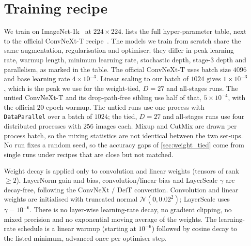 \section{Training recipe}
\label{app:training}

We train on ImageNet-1k~\citep{deng2009imagenet} at $224{\times}224$.
 lists the full hyper-parameter table, next to the official
ConvNeXt-T recipe~\citep{liu2022convnext}.
The models we train from scratch share the same augmentation, regularisation and
optimiser; they differ in peak learning rate, warmup length, minimum learning rate,
stochastic depth, stage-3 depth and parallelism, as marked in the table.
The official ConvNeXt-T uses batch size $4096$ and base learning rate $4{\times}10^{-3}$.
Linear scaling to our batch of $1024$ gives $1{\times}10^{-3}$, which is the peak we use
for the weight-tied, $D{=}27$ and all-stages runs.
The untied ConvNeXt-T and its drop-path-free sibling use half of that,
$5{\times}10^{-4}$, with the official $20$-epoch warmup.
The untied runs use one process with \texttt{DataParallel} over a batch of $1024$; the
tied, $D{=}27$ and all-stages runs use four distributed processes with $256$ images each.
Mixup and CutMix are drawn per process batch, so the mixing statistics are not
identical between the two set-ups.
No run fixes a random seed, so the accuracy gaps of \cref{sec:weight_tied} come from
single runs under recipes that are close but not matched.

Weight decay is applied only to convolution and linear weights (tensors of rank
$\ge 2$).
LayerNorm gain and bias, convolution/linear bias and LayerScale $\gamma$ are decay-free,
following the ConvNeXt / DeiT convention.
Convolution and linear weights are initialised with truncated normal $\mathcal{N}(0,0.02^2)$;
LayerScale uses $\gamma{=}10^{-6}$.
There is no layer-wise learning-rate decay, no gradient clipping, no mixed precision and
no exponential moving average of the weights.
The learning-rate schedule is a linear warmup (starting at $10^{-6}$) followed by cosine
decay to the listed minimum, advanced once per optimiser step.

